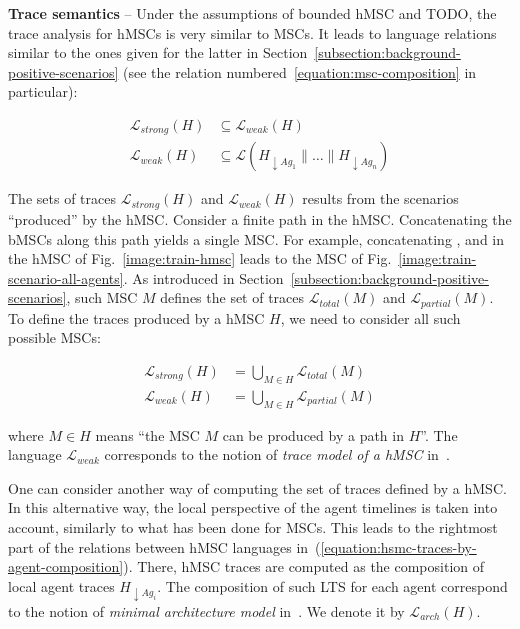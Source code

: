 \noindent \textbf{Trace semantics} -- Under the assumptions of bounded hMSC and TODO, the trace analysis for hMSCs is very similar to MSCs. It leads to language relations similar to the ones given for the latter in Section~\ref{subsection:background-positive-scenarios} (see the relation numbered~\ref{equation:msc-composition} in particular):

\vspace{-0.5cm}
\begin{align}
\mathcal{L}_{strong}(H) & \subseteq \mathcal{L}_{weak}(H) \\
\mathcal{L}_{weak}(H) & \subseteq \mathcal{L}(H_{\downarrow Ag_1} \parallel \ldots \parallel H_{\downarrow Ag_n})
\label{equation:hsmc-traces-by-agent-composition}
\end{align}

The sets of traces $\mathcal{L}_{strong}(H)$ and $\mathcal{L}_{weak}(H)$ results from the scenarios ``produced'' by the hMSC. Consider a finite path in the hMSC. Concatenating the bMSCs along this path yields a single MSC. For example, concatenating ,  and  in the hMSC of Fig.~\ref{image:train-hmsc} leads to the MSC of Fig.~\ref{image:train-scenario-all-agents}. As introduced in Section~\ref{subsection:background-positive-scenarios}, such MSC $M$ defines the set of traces $\mathcal{L}_{total}(M)$ and $\mathcal{L}_{partial}(M)$. To define the traces produced by a hMSC $H$, we need to consider all such possible MSCs: 

\vspace{-0.5cm}
\begin{align}
\mathcal{L}_{strong}(H) &= \bigcup_{M \in H} \mathcal{L}_{total}(M) \\
\mathcal{L}_{weak}(H) &= \bigcup_{M \in H} \mathcal{L}_{partial}(M)
\end{align}

\noindent where $M \in H$ means ``the MSC $M$ can be produced by a path in $H$''. The language $\mathcal{L}_{weak}$ corresponds to the notion of \emph{trace model of a hMSC} in~\cite{Uchitel:2004}.

One can consider another way of computing the set of traces defined by a hMSC. In this alternative way, the local perspective of the agent timelines is taken into account, similarly to what has been done for MSCs. This leads to the rightmost part of the relations between hMSC languages in~(\ref{equation:hsmc-traces-by-agent-composition}). There, hMSC traces are computed as the composition of local agent traces $H_{\downarrow Ag_i}$. The composition of such LTS for each agent correspond to the notion of \emph{minimal architecture model} in~\cite{Uchitel:2004}. We denote it by $\mathcal{L}_{arch}(H)$.

